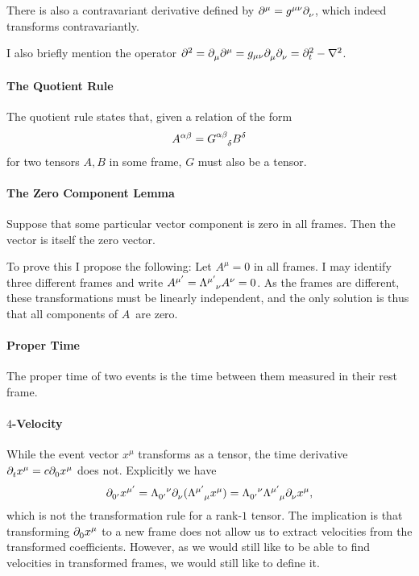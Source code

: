 There is also a contravariant derivative defined by $\del[\mu]{}{} = g^{\mu\nu}\del{\nu}{}$, which indeed transforms contravariantly.

I also briefly mention the operator $\del[2]{}{} = \del{\mu}{\del[\mu]{}{}} = g_{\mu\nu}\del{\mu}{\del{\nu}{}} = \del[2]{t}{} - \laplacian{}$. 

\paragraph{The Quotient Rule}
The quotient rule states that, given a relation of the form
\begin{align*}
	A^{\alpha\beta} = \tensor{G}{^{\alpha\beta}_{\delta}}B^{\delta}
\end{align*}
for two tensors $A, B$ in some frame, $G$ must also be a tensor.

\paragraph{The Zero Component Lemma}
Suppose that some particular vector component is zero in all frames. Then the vector is itself the zero vector.

To prove this I propose the following: Let $A^{\mu} = 0$ in all frames. I may identify three different frames and write $A^{\mu\p} = \trcou{\mu\p}{\nu}A^{\nu} = 0$. As the frames are different, these transformations must be linearly independent, and the only solution is thus that all components of $A$ are zero.

\paragraph{Proper Time}
The proper time of two events is the time between them measured in their rest frame.

\paragraph{$4$-Velocity}
While the event vector $x^{\mu}$ transforms as a tensor, the time derivative $\del{t}{x^{\mu}} = c\del{0}{x^{\mu}}$ does not. Explicitly we have
\begin{align*}
	\del{0\p}{x^{\mu\p}} = \trcod{0\p}{\nu}\del{\nu}{(\trcou{\mu\p}{\mu}x^{\mu})} = \trcod{0\p}{\nu}\trcou{\mu\p}{\mu}\del{\nu}{x^{\mu}},
\end{align*}
which is not the transformation rule for a rank-$1$ tensor. The implication is that transforming $\del{0}{x^{\mu}}$ to a new frame does not allow us to extract velocities from the transformed coefficients. However, as we would still like to be able to find velocities in transformed frames, we would still like to define it.

